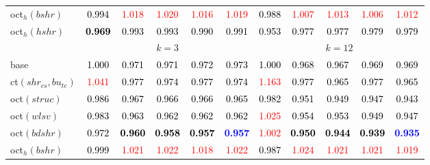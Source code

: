 \begin{tabular}[t]{l|>{}cccc>{}c|ccccc}
oct$_h(bshr)$ & \textcolor{black}{0.994} & \textcolor{red}{1.018} & \textcolor{red}{1.020} & \textcolor{red}{1.016} & \textcolor{red}{1.019} & \textcolor{black}{0.988} & \textcolor{red}{1.007} & \textcolor{red}{1.013} & \textcolor{red}{1.006} & \textcolor{red}{1.012}\\
oct$_h(hshr)$ & \textcolor{black}{\textbf{0.969}} & \textcolor{black}{0.993} & \textcolor{black}{0.993} & \textcolor{black}{0.990} & \textcolor{black}{0.991} & \textcolor{black}{0.953} & \textcolor{black}{0.977} & \textcolor{black}{0.977} & \textcolor{black}{0.979} & \textcolor{black}{0.979}\\
\addlinespace[0.3em]
\multicolumn{1}{c}{} & \multicolumn{5}{c}{\textbf{$k = 3$}} & \multicolumn{5}{c}{\textbf{$k = 12$}}\\
base & \textcolor{black}{1.000} & \textcolor{black}{0.971} & \textcolor{black}{0.971} & \textcolor{black}{0.972} & \textcolor{black}{0.973} & \textcolor{black}{1.000} & \textcolor{black}{0.968} & \textcolor{black}{0.967} & \textcolor{black}{0.969} & \textcolor{black}{0.969}\\
ct$(shr_{cs}, bu_{te})$ & \textcolor{red}{1.041} & \textcolor{black}{0.977} & \textcolor{black}{0.974} & \textcolor{black}{0.977} & \textcolor{black}{0.974} & \textcolor{red}{1.163} & \textcolor{black}{0.977} & \textcolor{black}{0.965} & \textcolor{black}{0.977} & \textcolor{black}{0.965}\\
oct$(struc)$ & \textcolor{black}{0.986} & \textcolor{black}{0.967} & \textcolor{black}{0.966} & \textcolor{black}{0.966} & \textcolor{black}{0.965} & \textcolor{black}{0.982} & \textcolor{black}{0.951} & \textcolor{black}{0.949} & \textcolor{black}{0.947} & \textcolor{black}{0.943}\\
oct$(wlsv)$ & \textcolor{black}{0.983} & \textcolor{black}{0.963} & \textcolor{black}{0.962} & \textcolor{black}{0.962} & \textcolor{black}{0.962} & \textcolor{red}{1.025} & \textcolor{black}{0.954} & \textcolor{black}{0.953} & \textcolor{black}{0.949} & \textcolor{black}{0.947}\\
oct$(bdshr)$ & \textcolor{black}{0.972} & \textcolor{black}{\textbf{0.960}} & \textcolor{black}{\textbf{0.958}} & \textcolor{black}{\textbf{0.957}} & \textcolor{blue}{\textbf{0.957}} & \textcolor{red}{1.002} & \textcolor{black}{\textbf{0.950}} & \textcolor{black}{\textbf{0.944}} & \textcolor{black}{\textbf{0.939}} & \textcolor{blue}{\textbf{0.935}}\\
oct$_h(bshr)$ & \textcolor{black}{0.999} & \textcolor{red}{1.021} & \textcolor{red}{1.022} & \textcolor{red}{1.018} & \textcolor{red}{1.022} & \textcolor{black}{0.987} & \textcolor{red}{1.024} & \textcolor{red}{1.021} & \textcolor{red}{1.021} & \textcolor{red}{1.019}\\

\end{tabular}
